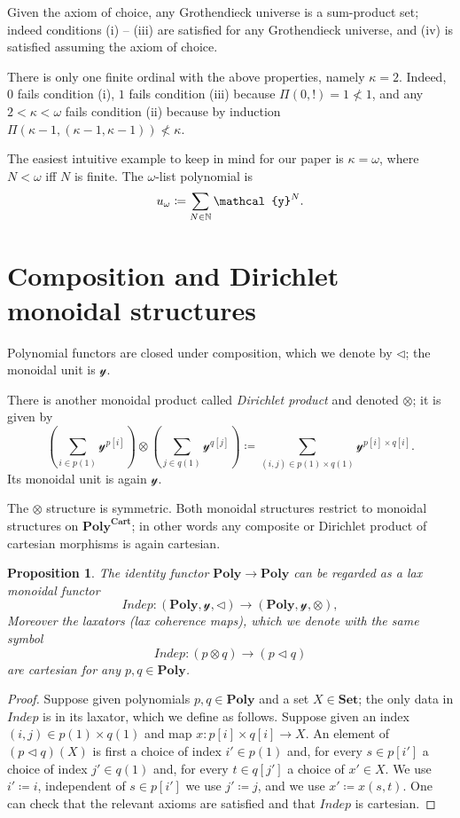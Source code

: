 \documentclass[11pt, one side, article]{memoir}
\theoremstyle{definition}
\theoremstyle{plain}
\newtheorem{proposition}[definitionx]{Proposition}
\newenvironment{example}
  {\pushQED{\qed}\renewcommand{\qedsymbol}{$\lozenge$}\examplex}
  {\popQED\endexamplex}
\newcommand{\Cat}[1]{\mathbf{#1}}%
\newcommand{\Fun}[1]{\mathit{#1}}%
\newcommand{\nn}{\mathbb{N}}
\newcommand{\smset}{\Cat{Set}}
\newcommand{\yon}{\mathcal{y}}
\newcommand{\poly}{\Cat{Poly}}
\newcommand{\polycart}{\poly^{\Cat{Cart}}}
\newcommand{\0}{\textsf{0}}
\newcommand{\1}{\tn{\textsf{1}}}
\newcommand{\tri}{\mathbin{\triangleleft}}
\newcommand{\indep}{\Fun{Indep}}
\begin{document}
\begin{example}\label{ex.sum_prod_set}
Given the axiom of choice, any Grothendieck universe is a sum-product set; indeed conditions (i) -- (iii) are satisfied for any Grothendieck universe, and (iv) is satisfied assuming the axiom of choice.

There is only one finite ordinal with the above properties, namely $\kappa=2$. Indeed, $0$ fails condition (i), $1$ fails condition (iii) because $\Pi(0,!)=1\not<1$, and any $2<\kappa<\omega$ fails condition (ii) because by induction $\Pi(\kappa-1,(\kappa-1,\kappa-1))\not<\kappa$.

The easiest intuitive example to keep in mind for our paper is $\kappa=\omega$, where $N<\omega$ iff $N$ is finite. The $\omega$-list polynomial is
\[
  u_\omega\coloneqq\sum_{N\in\nn}\yon^N.
\qedhere
\]
\end{example}

\section{Composition and Dirichlet monoidal structures}

Polynomial functors are closed under composition, which we denote by $\tri$; the monoidal unit is $\yon$.

There is another monoidal product called \emph{Dirichlet product} and denoted $\otimes$; it is given by
\[
\left(\sum_{i\in p(1)}\yon^{p[i]}\right)\otimes
\left(\sum_{j\in q(1)}\yon^{q[j]}\right)\coloneqq
\sum_{(i,j)\in p(1)\times q(1)}\yon^{p[i]\times q[i]}.
\]
Its monoidal unit is again $\yon$. 

The $\otimes$ structure is symmetric. Both monoidal structures restrict to monoidal structures on $\polycart$; in other words any composite or Dirichlet product of cartesian morphisms is again cartesian.

\begin{proposition}\label{prop.indep}
The identity functor $\poly\to\poly$ can be regarded as a lax monoidal functor
\begin{equation}\label{eqn.indep}
	\indep\colon (\poly,\yon,\tri)\to(\poly,\yon,\otimes),
\end{equation}
Moreover the laxators (lax coherence maps), which we denote with the same symbol
\[\indep\colon (p\otimes q)\to (p\tri q)\]
are cartesian for any $p,q\in\poly$.
\end{proposition}
\begin{proof}
Suppose given polynomials $p,q\in\poly$ and a set $X\in\smset$; the only data in $\indep$ is in its laxator, which we define as follows. Suppose given an index $(i,j)\in p(1)\times q(1)$ and map $x\colon p[i]\times q[i]\to X$. An element of $(p\tri q)(X)$ is first a choice of index $i'\in p(1)$ and, for every $s\in p[i']$ a choice of index $j'\in q(1)$ and, for every $t\in q[j']$ a choice of $x'\in X$. We use $i'\coloneqq i$, independent of $s\in p[i']$ we use $j'\coloneqq j$, and we use $x'\coloneqq x(s,t)$. One can check that the relevant axioms are satisfied and that $\indep$ is cartesian.
\end{proof}
\end{document}
